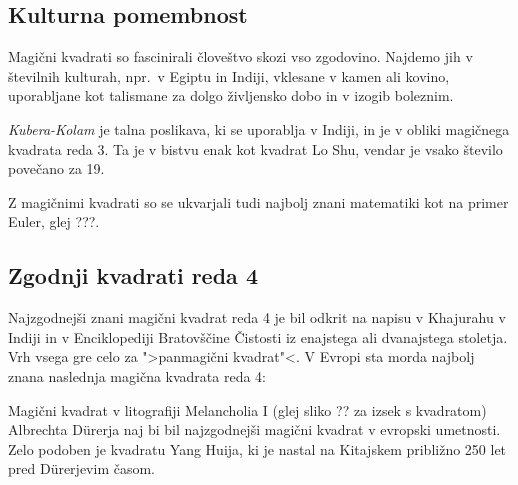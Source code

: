 \documentclass[a4paper,12pt]{article}
\begin{document}


\subsection{Kulturna pomembnost}

Magični kvadrati so fascinirali človeštvo skozi vso zgodovino. Najdemo jih
v številnih kulturah, npr.\ v Egiptu in Indiji, vklesane v kamen ali
kovino, uporabljane kot talismane za dolgo življensko dobo in v
izogib boleznim.

\emph{Kubera-Kolam} je talna poslikava, ki se uporablja v Indiji, in je v
obliki magičnega kvadrata reda 3. Ta je v bistvu enak kot kvadrat
Lo Shu, vendar je vsako število povečano za 19.


Z magičnimi kvadrati so se ukvarjali tudi najbolj znani matematiki kot na
primer Euler, glej ???. %


\subsection{Zgodnji kvadrati reda 4}

Najzgodnejši znani magični kvadrat reda 4 je bil odkrit na napisu
v Khajurahu v Indiji in v Enciklopediji Bratovščine Čistosti iz enajstega
ali dvanajstega stoletja. Vrh vsega gre celo za ">panmagični kvadrat"<.
V Evropi sta morda najbolj znana naslednja magična kvadrata reda 4:

Magični kvadrat v litografiji Melancholia I (glej sliko ??
za izsek s kvadratom) Albrechta Dürerja naj bi bil najzgodnejši magični kvadrat
v evropski umetnosti. Zelo podoben je kvadratu Yang Huija, ki je nastal na Kitajskem
približno 250 let pred Dürerjevim časom. %
\end{document}
